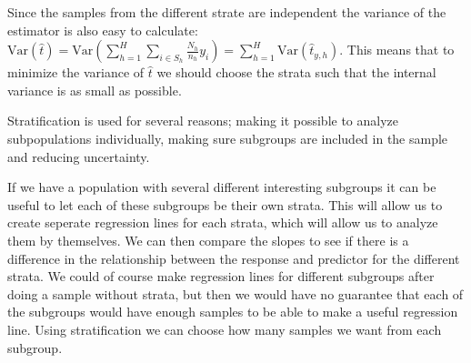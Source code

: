 \documentclass{article}
\begin{document}
Since the samples from the different strate are independent the variance of the estimator is also
easy to calculate: \(\mathrm{Var}(\hat{t}) = \mathrm{Var}\left(\sum_{h =
   1}^H\sum_{i \in S_h}\frac{N_h}{n_h}y_i\right) = \sum_{h =
   1}^H\mathrm{Var}\left(\hat{t}_{y, h}\right)\). This
means that to minimize the variance of \(\hat{t}\) we should choose the strata
such that the internal variance is as small as possible.

Stratification is used for several reasons; making it possible to analyze
subpopulations individually, making sure subgroups are included in the sample
and reducing uncertainty.

If we have a population with several different interesting subgroups it can be
useful to let each of these subgroups be their own strata. This will allow us to
create seperate regression lines for each strata, which will allow us to
analyze them by themselves. We can then compare the slopes to see if there is a difference in the relationship between the
response and predictor for the different strata. We could of course make
regression lines for different subgroups after doing a sample without strata,
but then we would have no guarantee that each of the subgroups would have enough
samples to be able to make a useful regression line. Using stratification we can
choose how many samples we want from each subgroup.

\end{document}
